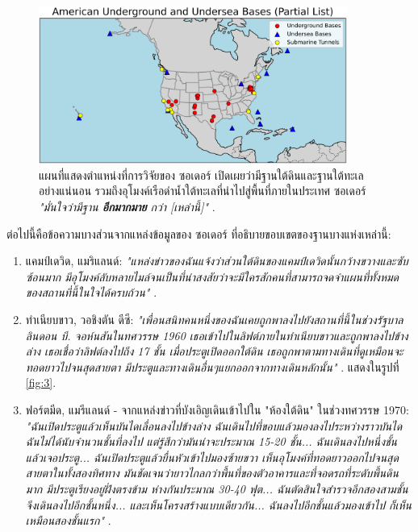 \documentclass[10pt,twocolumn,letterpaper]{article}
\begin{document}
\begin{figure}[t]
\begin{center}
\includegraphics[width=0.9\textwidth]{basescrop.png}
\end{center}
\caption{แผนที่แสดงตำแหน่งที่การวิจัยของ  ซอเดอร์ เปิดเผยว่ามีฐานใต้ดินและฐานใต้ทะเลอย่างแน่นอน รวมถึงอุโมงค์เรือดำน้ำใต้ทะเลที่นำไปสู่พื้นที่ภายในประเทศ ซอเดอร์ \textit{"มั่นใจว่ามีฐาน \textbf{อีกมากมาย} กว่า [เหล่านี้]"} \cite{22}.}
\label{fig:4}
\end{figure}

ต่อไปนี้คือข้อความบางส่วนจากแหล่งข้อมูลของ  ซอเดอร์ ที่อธิบายขอบเขตของฐานบางแห่งเหล่านี้:
\begin{flushleft}
\begin{enumerate}
    \item แคมป์เดวิด, แมริแลนด์: \textit{"แหล่งข่าวของฉันแจ้งว่าส่วนใต้ดินของแคมป์เดวิดนั้นกว้างขวางและซับซ้อนมาก มีอุโมงค์ลับหลายไมล์จนเป็นที่น่าสงสัยว่าจะมีใครสักคนที่สามารถจดจำแผนที่ทั้งหมดของสถานที่นี้ในใจได้ครบถ้วน"} \cite{22}.
    \item ทำเนียบขาว, วอชิงตัน ดีซี: \textit{"เพื่อนสนิทคนหนึ่งของฉันเคยถูกพาลงไปยังสถานที่นี้ในช่วงรัฐบาลลินดอน บี. จอห์นสันในทศวรรษ 1960 เธอเข้าไปในลิฟต์ภายในทำเนียบขาวและถูกพาลงไปข้างล่าง เธอเชื่อว่าลิฟต์ลงไปถึง 17 ชั้น เมื่อประตูเปิดออกใต้ดิน เธอถูกพาตามทางเดินที่ดูเหมือนจะทอดยาวไปจนสุดสายตา มีประตูและทางเดินอื่นๆแยกออกจากทางเดินหลักนั้น"} \cite{22}. แสดงในรูปที่ \ref{fig:3}.
    \item ฟอร์ตมีด, แมรีแลนด์ - จากแหล่งข่าวที่บังเอิญเดินเข้าไปใน "ห้องใต้ดิน" ในช่วงทศวรรษ 1970: \textit{"ฉันเปิดประตูแล้วเห็นบันไดเลื่อนลงไปข้างล่าง ฉันเดินไปที่ขอบแล้วมองลงไประหว่างราวบันได ฉันไม่ได้นับจำนวนชั้นที่ลงไป แต่รู้สึกว่ามันน่าจะประมาณ 15-20 ชั้น... ฉันเดินลงไปหนึ่งชั้นแล้วเจอประตู... ฉันเปิดประตูแล้วยื่นหัวเข้าไปมองซ้ายขวา เห็นอุโมงค์ที่ทอดยาวออกไปจนสุดสายตาในทั้งสองทิศทาง มันชัดเจนว่ายาวไกลกว่าพื้นที่ของตัวอาคารและที่จอดรถที่ระดับพื้นดินมาก มีประตูเรียงอยู่ฝั่งตรงข้าม ห่างกันประมาณ 30-40 ฟุต... ฉันตัดสินใจสำรวจอีกสองสามชั้น จึงเดินลงไปอีกชั้นหนึ่ง... และเห็นโครงสร้างแบบเดียวกัน... ฉันลงไปอีกชั้นแล้วมองเข้าไป ก็เห็นเหมือนสองชั้นแรก"} \cite{22}.
\end{enumerate}
\end{flushleft}
\end{document}
